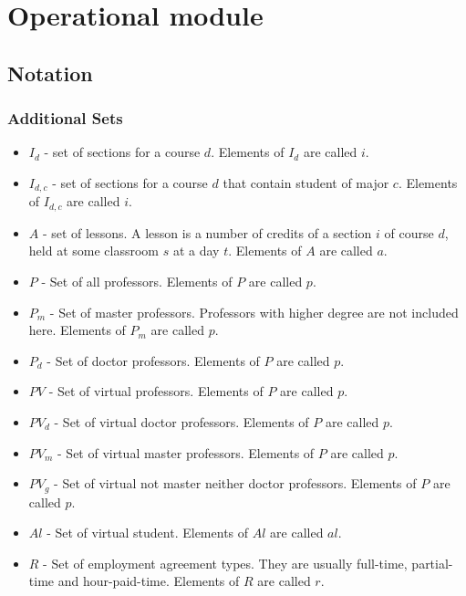 \section{Operational module}


\subsection{Notation}

\subsubsection{Additional Sets}
\begin{itemize}
\item $I_{d}$ - set of sections for a course $d$.  Elements of $I_{d}$ are called $i$.
\item $I_{d,c}$ - set of sections for a course $d$ that contain student of major $c$. Elements of $I_{d,c}$ are called $i$.
\item $A$ - set of lessons. A lesson is a number of credits of a section $i$ of course $d$, held at some classroom $s$ at a day $t$. Elements of $A$ are called $a$.
\item $P$ - Set of all professors. Elements of $P$ are called $p$.
\item $P_{m}$ - Set of master professors. Professors with higher degree are not included here. Elements of $P_{m}$ are called $p$.
\item $P_{d}$ - Set of doctor professors. Elements of $P$ are called $p$.
\item $PV$ - Set of virtual professors. Elements of $P$ are called $p$.
\item $PV_{d}$ - Set of virtual doctor professors. Elements of $P$ are called $p$.
\item $PV_{m}$ - Set of virtual master professors. Elements of $P$ are called $p$.
\item $PV_{g}$ - Set of virtual not master neither doctor professors. Elements of $P$ are called $p$.
\item $Al$ - Set of virtual student. Elements of $Al$ are called $al$.
\item $R$ - Set of employment agreement types. They are usually full-time, partial-time and hour-paid-time. Elements of $R$ are called $r$.
\end{itemize}


